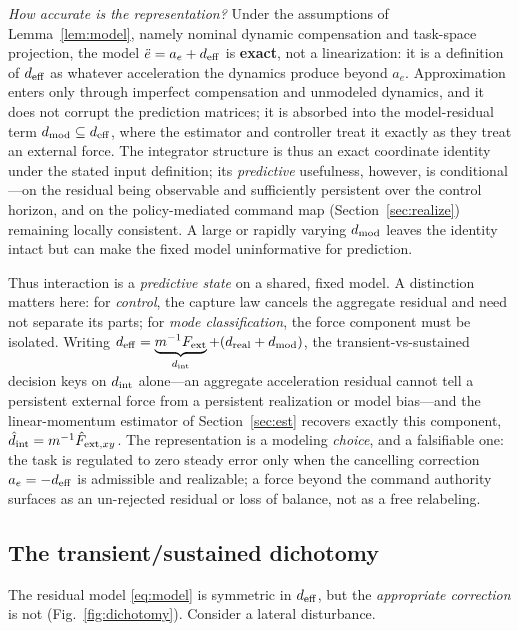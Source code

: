 \documentclass[journal]{IEEEtran}
\begin{document}
\emph{How accurate is the representation?} Under the assumptions of Lemma~\ref{lem:model}, namely nominal dynamic compensation and task-space projection, the model $\ddot e = a_e + d_{\rm eff}$ is \textbf{exact}, not a linearization: it is a definition of $d_{\rm eff}$ as whatever acceleration the dynamics produce beyond $a_e$. Approximation enters only through imperfect compensation and unmodeled dynamics, and it does not corrupt the prediction matrices; it is absorbed into the model-residual term $d_{\rm mod}\subseteq d_{\rm eff}$, where the estimator and controller treat it exactly as they treat an external force. The integrator structure is thus an exact coordinate identity under the stated input definition; its \emph{predictive} usefulness, however, is conditional---on the residual being observable and sufficiently persistent over the control horizon, and on the policy-mediated command map (Section~\ref{sec:realize}) remaining locally consistent. A large or rapidly varying $d_{\rm mod}$ leaves the identity intact but can make the fixed model uninformative for prediction.

Thus interaction is a \emph{predictive state} on a shared, fixed model. A distinction matters here: for \emph{control}, the capture law cancels the aggregate residual and need not separate its parts; for \emph{mode classification}, the force component must be isolated. Writing $d_{\rm eff}=\underbrace{m^{-1}F_{\rm ext}}_{d_{\rm int}}+(d_{\rm real}+d_{\rm mod})$, the transient-vs-sustained decision keys on $d_{\rm int}$ alone---an aggregate acceleration residual cannot tell a persistent external force from a persistent realization or model bias---and the linear-momentum estimator of Section~\ref{sec:est} recovers exactly this component, $\hat d_{\rm int}=m^{-1}\hat F_{{\rm ext},xy}$. The representation is a modeling \emph{choice}, and a falsifiable one: the task is regulated to zero steady error only when the cancelling correction $a_e=-d_{\rm eff}$ is admissible and realizable; a force beyond the command authority surfaces as an un-rejected residual or loss of balance, not as a free relabeling.

\subsection{The transient/sustained dichotomy}
\label{sec:dichotomy}

The residual model \eqref{eq:model} is symmetric in $d_{\rm eff}$, but the \emph{appropriate correction} is not (Fig.~\ref{fig:dichotomy}). Consider a lateral disturbance.
\end{document}
